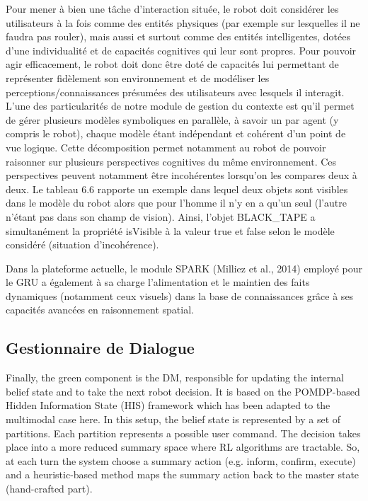 \documentclass[a4paper,11pt,twoside]{StyleThese}
\begin{document}
Pour mener à bien une tâche d’interaction située, le robot doit considérer les utilisateurs
à la fois comme des entités physiques (par exemple sur lesquelles il ne faudra pas
rouler), mais aussi et surtout comme des entités intelligentes, dotées d’une individualité
et de capacités cognitives qui leur sont propres. Pour pouvoir agir efficacement, le
robot doit donc être doté de capacités lui permettant de représenter fidèlement son environnement
et de modéliser les perceptions/connaissances présumées des utilisateurs
avec lesquels il interagit.
L’une des particularités de notre module de gestion du contexte est qu’il permet
de gérer plusieurs modèles symboliques en parallèle, à savoir un par agent (y compris
le robot), chaque modèle étant indépendant et cohérent d’un point de vue logique.
Cette décomposition permet notamment au robot de pouvoir raisonner sur plusieurs
perspectives cognitives du même environnement. Ces perspectives peuvent notamment
être incohérentes lorsqu’on les compares deux à deux. Le tableau 6.6 rapporte
un exemple dans lequel deux objets sont visibles dans le modèle du robot alors que
pour l’homme il n’y en a qu’un seul (l’autre n’étant pas dans son champ de vision).
Ainsi, l’objet BLACK\_TAPE a simultanément la propriété isVisible à la valeur true et
false selon le modèle considéré (situation d’incohérence).


Dans la plateforme actuelle, le module SPARK (Milliez et al., 2014) employé pour le
GRU a également à sa charge l’alimentation et le maintien des faits dynamiques (notamment
ceux visuels) dans la base de connaissances grâce à ses capacités avancées en
raisonnement spatial.


\subsection{Gestionnaire de Dialogue}
Finally, the green component is the DM, responsible for updating the internal belief state and to take the next robot decision. It is based on the POMDP-based Hidden Information State (HIS) framework \cite{Young10} which has been adapted to the multimodal case here. In this setup, the belief state is represented by a set of partitions. Each partition represents a possible user command. The decision takes place into a more reduced summary space  where RL algorithms are tractable. So, at each turn the system choose a summary action (e.g. inform, confirm, execute) and a heuristic-based method maps the summary action back to the master state (hand-crafted part).
\end{document}
